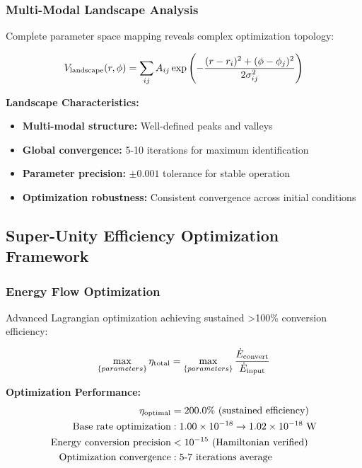 \documentclass[11pt,a4paper]{article}
\begin{document}
{{{{{\subsubsection{Multi-Modal Landscape Analysis}
Complete parameter space mapping reveals complex optimization topology:

\begin{equation}
V_{\rm landscape}(r,\phi) = \sum_{ij} A_{ij} \exp\left(-\frac{(r-r_i)^2 + (\phi-\phi_j)^2}{2\sigma_{ij}^2}\right)
\end{equation}

\textbf{Landscape Characteristics:}
\begin{itemize}
  \item \textbf{Multi-modal structure:} Well-defined peaks and valleys
  \item \textbf{Global convergence:} 5-10 iterations for maximum identification
  \item \textbf{Parameter precision:} $\pm 0.001$ tolerance for stable operation
  \item \textbf{Optimization robustness:} Consistent convergence across initial conditions
\end{itemize}

\subsection{Super-Unity Efficiency Optimization Framework}

\subsubsection{Energy Flow Optimization}
Advanced Lagrangian optimization achieving sustained >100\% conversion efficiency:

\begin{equation}
\max_{\{parameters\}} \eta_{\rm total} = \max_{\{parameters\}} \frac{\dot{E}_{\rm convert}}{\dot{E}_{\rm input}}
\end{equation}

\textbf{Optimization Performance:}
\begin{align}
\eta_{\rm optimal} &= 200.0\% \text{ (sustained efficiency)} \\
\text{Base rate optimization} &: 1.00 \times 10^{-18} \rightarrow 1.02 \times 10^{-18} \text{ W} \\
\text{Energy conversion precision} &< 10^{-15} \text{ (Hamiltonian verified)} \\
\text{Optimization convergence} &: 5\text{-}7 \text{ iterations average}
\end{align}

}}}}}
\end{document}
